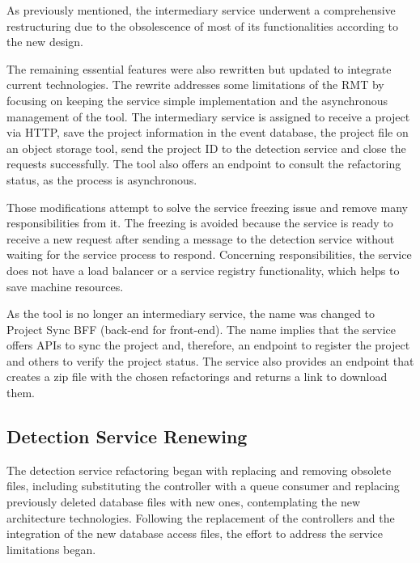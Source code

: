 As previously mentioned, the intermediary service underwent a comprehensive restructuring due to the obsolescence of most of its functionalities according to the new design. 

The remaining essential features were also rewritten but updated to integrate current technologies. The rewrite addresses some limitations of the RMT by focusing on keeping the service simple implementation and the asynchronous management of the tool. The intermediary service is assigned to receive a project via HTTP, save the project information in the event database, the project file on an object storage tool, send the project ID to the detection service and close the requests successfully. The tool also offers an endpoint to consult the refactoring status, as the process is asynchronous.

Those modifications attempt to solve the service freezing issue and remove many responsibilities from it. The freezing is avoided because the service is ready to receive a new request after sending a message to the detection service without waiting for the service process to respond. Concerning responsibilities, the service does not have a load balancer or a service registry functionality, which helps to save machine resources.

As the tool is no longer an intermediary service, the name was changed to Project Sync BFF (back-end for front-end). The name implies that the service offers APIs to sync the project and, therefore, an endpoint to register the project and others to verify the project status. The service also provides an endpoint that creates a zip file with the chosen refactorings and returns a link to download them.


\subsection{Detection Service Renewing}
\label{sub-restruct-detection}

The detection service refactoring began with replacing and removing obsolete files, including substituting the controller with a queue consumer and replacing previously deleted database files with new ones, contemplating the new architecture technologies. Following the replacement of the controllers and the integration of the new database access files, the effort to address the service limitations began.

